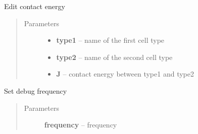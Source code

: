 \documentclass[letterpaper,10pt,english]{sphinxmanual}
\begin{document}
\begin{fulllineitems}
\begin{fulllineitems}
\begin{quote}
\begin{description}
\end{description}\end{quote}

\end{fulllineitems}


\begin{fulllineitems}
\label{Experiment:Experiment.Experiment.setContact}
Edit contact energy
\begin{quote}\begin{description}
\item[{Parameters}] \leavevmode\begin{itemize}
\item {} 
\textbf{type1} -- name of the first cell type

\item {} 
\textbf{type2} -- name of the second cell type

\item {} 
\textbf{J} -- contact energy between type1 and type2

\end{itemize}

\end{description}\end{quote}

\end{fulllineitems}


\begin{fulllineitems}
\label{Experiment:Experiment.Experiment.setDebugFrequencyInMeta}
Set debug frequency
\begin{quote}\begin{description}
\item[{Parameters}] \leavevmode
\textbf{frequency} -- frequency

\end{description}\end{quote}

\end{fulllineitems}



\end{fulllineitems}
\end{document}
